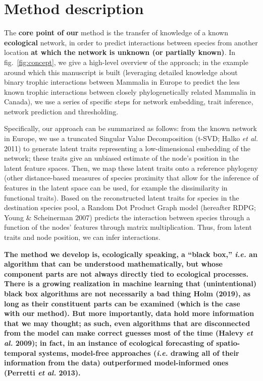 \documentclass[11pt]{article}
\makeatletter
\def\maxwidth{\ifdim\Gin@nat@width>\linewidth\linewidth
\else\Gin@nat@width\fi}
\let\Oldincludegraphics\includegraphics
\renewcommand{\includegraphics}[1]{\Oldincludegraphics[width=\maxwidth]{#1}}
\providecommand{\DIFaddtex}[1]{{\bf #1}} %
\providecommand{\DIFdeltex}[1]{} %
\providecommand{\DIFaddbegin}{\protect\color{blue}} %
\providecommand{\DIFaddend}{\protect\color{black}} %
\providecommand{\DIFdelbegin}{\protect\color{red}} %
\providecommand{\DIFdelend}{\protect\color{black}} %
\providecommand{\DIFadd}[1]{\texorpdfstring{\DIFaddtex{#1}}{#1}} %
\providecommand{\DIFdel}[1]{\texorpdfstring{\DIFdeltex{#1}}{}} %
\newcommand{\DIFscaledelfig}{0.5}
\newlength{\DIFdelgraphicswidth} %
\newlength{\DIFdelgraphicsheight} %
\newcommand{\DIFaddincludegraphics}[2][]{{\color{blue}\fbox{\DIFOincludegraphics[#1]{#2}}}} %
\newcommand{\DIFdelincludegraphics}[2][]{%
\sbox{\DIFdelgraphicsbox}{\DIFOincludegraphics[#1]{#2}}%
\settoboxwidth{\DIFdelgraphicswidth}{\DIFdelgraphicsbox} %
\settoboxtotalheight{\DIFdelgraphicsheight}{\DIFdelgraphicsbox} %
\scalebox{\DIFscaledelfig}{%
\parbox[b]{\DIFdelgraphicswidth}{\usebox{\DIFdelgraphicsbox}\\[-\baselineskip] \rule{\DIFdelgraphicswidth}{0em}}\llap{\resizebox{\DIFdelgraphicswidth}{\DIFdelgraphicsheight}{%
\setlength{\unitlength}{\DIFdelgraphicswidth}%
\begin{picture}(1,1)%
\thicklines\linethickness{2pt} %
{\color[rgb]{1,0,0}\put(0,0){\framebox(1,1){}}}%
{\color[rgb]{1,0,0}\put(0,0){\line( 1,1){1}}}%
{\color[rgb]{1,0,0}\put(0,1){\line(1,-1){1}}}%
\end{picture}%
}\hspace*{3pt}}} %
} %
\DeclareRobustCommand{\DIFaddbegin}{\DIFOaddbegin \let\includegraphics\DIFaddincludegraphics} %
\DeclareRobustCommand{\DIFaddend}{\DIFOaddend \let\includegraphics\DIFOincludegraphics} %
\DeclareRobustCommand{\DIFdelbegin}{\DIFOdelbegin \let\includegraphics\DIFdelincludegraphics} %
\DeclareRobustCommand{\DIFdelend}{\DIFOaddend \let\includegraphics\DIFOincludegraphics} %
\makeatother
\begin{document}
\hypertarget{method-description}{%
\section{Method description}\label{method-description}}

The \DIFdelbegin \DIFdel{crux of the }\DIFdelend \DIFaddbegin \DIFadd{core point of our }\DIFaddend method is the transfer of knowledge of a known
\DIFaddbegin \DIFadd{ecological }\DIFaddend network, in order to predict interactions between species
from another location \DIFaddbegin \DIFadd{at which the network is unknown (or partially
known)}\DIFaddend . In fig.~\ref{fig:concept}, we give a high-level overview of the
approach; in the example around which this manuscript is built
(leveraging detailed knowledge about binary trophic interactions between
Mammalia in Europe to predict the less known trophic interactions
between closely phylogenetically related Mammalia in Canada), we use a
series of specific steps for network embedding, trait inference, network
prediction and thresholding.

Specifically, our approach can be summarized as follows: from the known
network in Europe, we use a truncated Singular Value Decomposition
(t-SVD; Halko \emph{et al.} 2011) to generate latent traits representing
a low-dimensional embedding of the network; these traits give an
unbiased estimate of the node's position in the latent feature spaces.
Then, we map these latent traits onto a reference phylogeny (other
distance-based measures of species proximity that allow for the
inference of features in the latent space can be used, for example the
dissimilarity in functional traits). Based on the reconstructed latent
traits for species in the destination species pool, a Random Dot Product
Graph model (hereafter RDPG; Young \& Scheinerman 2007) predicts the
interaction between species through a function of the nodes' features
through matrix multiplication. Thus, from latent traits and node
position, we can infer interactions.

\DIFaddbegin \DIFadd{The method we develop is, ecologically speaking, a ``black box,''
\emph{i.e.} an algorithm that can be understood mathematically, but
whose component parts are not always directly tied to ecological
processes. There is a growing realization in machine learning that
(unintentional) black box algorithms are not necessarily a bad thing
Holm (2019), as long as their constituent parts can be examined (which
is the case with our method). But more importantly, data hold more
information that we may thought; as such, even algorithms that are
disconnected from the model can make correct guesses most of the time
(Halevy \emph{et al.} 2009); in fact, in an instance of ecological
forecasting of spatio-temporal systems, model-free approaches
(\emph{i.e.} drawing all of their information from the data)
outperformed model-informed ones (Perretti \emph{et al.} 2013).
}
\end{document}

